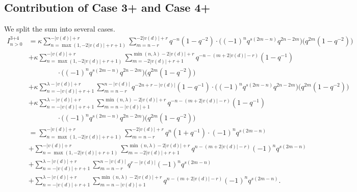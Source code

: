 \subsection{Contribution of Case 3\ts+ and Case 4\ts+}
We split the sum into several cases.
\begin{align*}
  I_{n > 0}^{\text{3+4}}
  &= \kappa \sum_{n=\max(1, -2|v(d)|+r+1)}^{-|v(d)|+r}
    \sum_{m=n-r}^{-2|v(d)|+r}
    q^{-n} \left( 1 - q^{-2} \right)
    \cdot \Big( (-1)^n q^{s(2m-n)} q^{2n-2m} \Big) \Big( q^{2m}(1-q^{-2}) \Big) \\
  &+ \kappa \sum_{n=\max(1, -2|v(d)|+r+1)}^{-|v(d)|+r}
    \sum_{m=-2|v(d)|+r+1}^{\min(n, \lambda) - 2|v(d)| + r}
    q^{-n-(m+2|v(d)|-r)} \left( 1 - q^{-1} \right) \\
    &\qquad\qquad\cdot \Big( (-1)^n q^{s(2m-n)} q^{2n-2m} \Big) \Big( q^{2m}(1-q^{-2}) \Big) \\
  &+ \kappa \sum_{n=-|v(d)|+r+1}^{\lambda-|v(d)|+r}
    \sum_{m=n-r}^{n-|v(d)|}
    q^{-2n+r-|v(d)|} \left( 1 - q^{-1} \right)
    \cdot \Big( (-1)^n q^{s(2m-n)} q^{2n-2m} \Big) \Big( q^{2m}(1-q^{-2}) \Big) \\
  &+ \kappa \sum_{n=-|v(d)|+r+1}^{\lambda-|v(d)|+r}
    \sum_{m=n-|v(d)|+1}^{\min(n, \lambda) - 2|v(d)| + r}
    q^{-n - (m+2|v(d)|-r)} \left( 1 - q^{-1} \right) \\
    &\qquad\qquad\cdot \Big( (-1)^n q^{s(2m-n)} q^{2n-2m} \Big) \Big( q^{2m}(1-q^{-2}) \Big) \\
  &= \sum_{n=\max(1, -2|v(d)|+r+1)}^{-|v(d)|+r}
    \sum_{m=n-r}^{-2|v(d)|+r}
    q^{n} \left( 1 + q^{-1} \right) \cdot (-1)^n q^{s(2m-n)} \\
  &+ \sum_{n=\max(1, -2|v(d)|+r+1)}^{-|v(d)|+r}
    \sum_{m=-2|v(d)|+r+1}^{\min(n, \lambda) - 2|v(d)| + r}
    q^{n-(m+2|v(d)|-r)} (-1)^n q^{s(2m-n)} \\
  &+ \sum_{n=-|v(d)|+r+1}^{\lambda-|v(d)|+r}
    \sum_{m=n-r}^{n-|v(d)|} q^{r-|v(d)|} (-1)^n q^{s(2m-n)} \\
  &+ \sum_{n=-|v(d)|+r+1}^{\lambda-|v(d)|+r}
    \sum_{m=n-|v(d)|+1}^{\min(n, \lambda) - 2|v(d)| + r}
    q^{n - (m+2|v(d)|-r)} (-1)^n q^{s(2m-n)}.
\end{align*}

